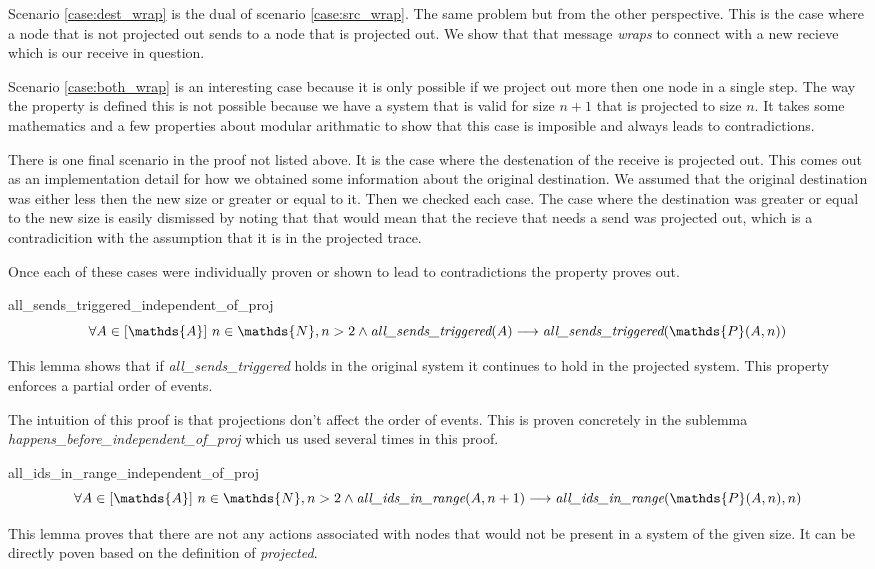 \documentclass[runningheads]{llncs}
\newcommand{\action}{\mathds{A}}
\newcommand{\listaction}{[\action]}
\newcommand{\projectsize}[2]{\mathds{P}(#1, #2)}
\newcommand{\allst}[1]{\emph{all\_sends\_triggered}(#1)}
\newcommand{\allir}[2]{\emph{all\_ids\_in\_range}(#1, #2)}
\begin{document}
Scenario \ref{case:dest_wrap} is the dual of scenario \ref{case:src_wrap}. The same problem but from the other perspective. This is the case where a node that is not projected out sends to a node that is projected out. We show that that message \emph{wraps} to connect with a new recieve which is our receive in question. %

Scenario \ref{case:both_wrap} is an interesting case because it is only possible if we project out more then one node in a single step. The way the property is defined this is not possible because we have a system that is valid for size $n+1$ that is projected to size $n$. It takes some mathematics and a few properties about modular arithmatic to show that this case is imposible and always leads to contradictions.

There is one final scenario in the proof not listed above. It is the case where the destenation of the receive is projected out. This comes out as an implementation detail for how we obtained some information about the original destination. We assumed that the original destination was either less then the new size or greater or equal to it. Then we checked each case. The case where the destination was greater or equal to the new size is easily dismissed by noting that that would mean that the recieve that needs a send was projected out, which is a contradicition with the assumption that it is in the projected trace.

Once each of these cases were individually proven or shown to lead to contradictions the property proves out.

\begin{lemma}{all\_sends\_triggered\_independent\_of\_proj}
$$ \forall A \in \listaction\ n \in \mathds{N}, n > 2 \wedge \allst{A} \longrightarrow \allst{\projectsize{A}{n}} $$
\end{lemma}
This lemma shows that if \emph{all\_sends\_triggered} holds in the original system it continues to hold in the projected system. This property enforces a partial order of events.

The intuition of this proof is that projections don't affect the order of events. This is proven concretely in the sublemma \emph{happens\_before\_independent\_of\_proj} which us used several times in this proof. 

\begin{lemma}{all\_ids\_in\_range\_independent\_of\_proj}
$$ \forall A \in \listaction\ n \in \mathds{N}, n > 2 \wedge \allir{A}{n+1} \longrightarrow \allir{\projectsize{A}{n}}{n} $$
\end{lemma}
This lemma proves that there are not any actions associated with nodes that would not be present in a system of the given size. It can be directly poven based on the definition of \emph{projected}. 
\end{document}
